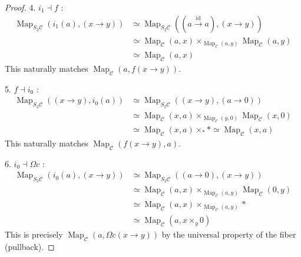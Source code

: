 \documentclass[a4paper,10pt, oneside]{amsart}
\begin{document}
\begin{proof}
	4. $i_1 \dashv f$ :
	\begin{align*}
		\operatorname{Map}_{S_2\mathcal{C}}(i_1(a), (x \to y)) &\simeq \operatorname{Map}_{S_2\mathcal{C}}((a \xrightarrow{\operatorname{id}} a), (x \to y)) \\
		&\simeq \operatorname{Map}_{\mathcal{C}}(a, x) \times_{\operatorname{Map}_{\mathcal{C}}(a, y)} \operatorname{Map}_{\mathcal{C}}(a, y) \\
		&\simeq \operatorname{Map}_{\mathcal{C}}(a, x)
	\end{align*}
	This naturally matches $\operatorname{Map}_{\mathcal{C}}(a, f(x \to y))$.
	
5. $f \dashv i_0$ :
	\begin{align*}
		\operatorname{Map}_{S_2\mathcal{C}}((x \to y), i_0(a)) &\simeq \operatorname{Map}_{S_2\mathcal{C}}((x \to y), (a \to 0)) \\
		&\simeq \operatorname{Map}_{\mathcal{C}}(x, a) \times_{\operatorname{Map}_{\mathcal{C}}(y, 0)} \operatorname{Map}_{\mathcal{C}}(x, 0) \\
		&\simeq \operatorname{Map}_{\mathcal{C}}(x, a) \times_{*} * \simeq \operatorname{Map}_{\mathcal{C}}(x, a)
	\end{align*}
	This naturally matches $\operatorname{Map}_{\mathcal{C}}(f(x \to y), a)$.
	
	6. $i_0 \dashv \Omega c$ :
	\begin{align*}
		\operatorname{Map}_{S_2\mathcal{C}}(i_0(a), (x \to y)) &\simeq \operatorname{Map}_{S_2\mathcal{C}}((a \to 0), (x \to y)) \\
		&\simeq \operatorname{Map}_{\mathcal{C}}(a, x) \times_{\operatorname{Map}_{\mathcal{C}}(a, y)} \operatorname{Map}_{\mathcal{C}}(0, y) \\
		&\simeq \operatorname{Map}_{\mathcal{C}}(a, x) \times_{\operatorname{Map}_{\mathcal{C}}(a, y)} * \\
		&\simeq \operatorname{Map}_{\mathcal{C}}(a, x \times_y 0)
	\end{align*}
	This is precisely $\operatorname{Map}_{\mathcal{C}}(a, \Omega c(x \to y))$ by the universal property of the fiber (pullback).
\end{proof}
\end{document}
